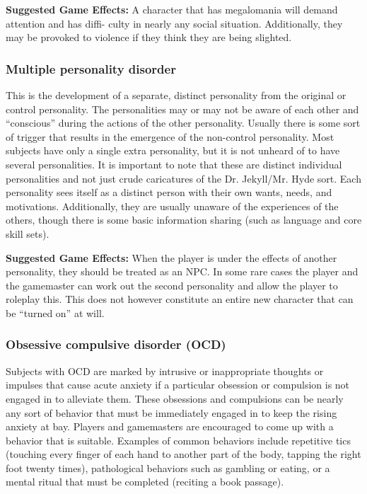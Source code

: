 \textbf{Suggested Game Effects:} A character that has megalomania will demand attention and has diffi- culty in nearly any social situation. Additionally, they may be provoked to violence if they think they are being slighted. 

\subsubsection{Multiple personality disorder} 

This is the development of a separate, distinct personality from the original or control personality. The personalities may or may not be aware of each other and ``conscious” during the actions of the other personality. Usually there is some sort of trigger that results in the emergence of the non-control personality. Most subjects have only a single extra personality, but it is not unheard of to have several personalities. It is important to note that these are distinct individual personalities and not just crude caricatures of the Dr. Jekyll/Mr. Hyde sort. Each personality sees itself as a distinct person with their own wants, needs, and motivations. Additionally, they are usually unaware of the experiences of the others, though there is some basic information sharing (such as language and core skill sets). 

\textbf{Suggested Game Effects:} When the player is under the effects of another personality, they should be treated as an NPC. In some rare cases the player and the gamemaster can work out the second personality and allow the player to roleplay this. This does not however constitute an entire new character that can be ``turned on” at will. 

\subsubsection{Obsessive compulsive disorder (OCD)} 

Subjects with OCD are marked by intrusive or inappropriate thoughts or impulses that cause acute anxiety if a particular obsession or compulsion is not engaged in to alleviate them. These obsessions and compulsions can be nearly any sort of behavior that must be immediately engaged in to keep the rising anxiety at bay. Players and gamemasters are encouraged to come up with a behavior that is suitable. Examples of common behaviors include repetitive tics (touching every finger of each hand to another part of the body, tapping the right foot twenty times), pathological behaviors such as gambling or eating, or a mental ritual that must be completed (reciting a book passage). 

